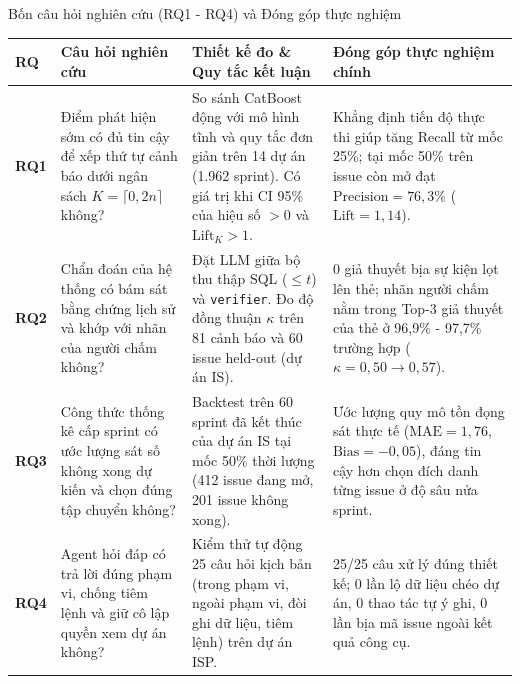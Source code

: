\begin{frame}{Bốn câu hỏi nghiên cứu (RQ1 - RQ4) và Đóng góp thực nghiệm}
  \scriptsize
  \setlength{\tabcolsep}{4pt}
  \renewcommand{\arraystretch}{1.28}
  \begin{tabular}{L{0.07\textwidth}|L{0.28\textwidth}|L{0.31\textwidth}|L{0.28\textwidth}}
    \textbf{RQ} & \textbf{Câu hỏi nghiên cứu} & \textbf{Thiết kế đo \& Quy tắc kết luận} & \textbf{Đóng góp thực nghiệm chính} \\
    \hline
    \textbf{RQ1} & Điểm phát hiện sớm có đủ tin cậy để xếp thứ tự cảnh báo dưới ngân sách $K = \lceil 0{,}2n \rceil$ không? & So sánh CatBoost động với mô hình tĩnh và quy tắc đơn giản trên 14 dự án (1.962 sprint). Có giá trị khi CI 95\% của hiệu số $>0$ và $\text{Lift}_K > 1$. & Khẳng định tiến độ thực thi giúp tăng Recall từ mốc 25\%; tại mốc 50\% trên issue còn mở đạt $\text{Precision} = 76{,}3\%$ ($\text{Lift} = 1{,}14$). \\
    \hline
    \textbf{RQ2} & Chẩn đoán của hệ thống có bám sát bằng chứng lịch sử và khớp với nhãn của người chấm không? & Đặt LLM giữa bộ thu thập SQL ($\le t$) và \texttt{verifier}. Đo độ đồng thuận $\kappa$ trên 81 cảnh báo và 60 issue held-out (dự án IS). & 0 giả thuyết bịa sự kiện lọt lên thẻ; nhãn người chấm nằm trong Top-3 giả thuyết của thẻ ở 96,9\% - 97,7\% trường hợp ($\kappa = 0{,}50 \to 0{,}57$). \\
    \hline
    \textbf{RQ3} & Công thức thống kê cấp sprint có ước lượng sát số không xong dự kiến và chọn đúng tập chuyển không? & Backtest trên 60 sprint đã kết thúc của dự án IS tại mốc 50\% thời lượng (412 issue đang mở, 201 issue không xong). & Ước lượng quy mô tồn đọng sát thực tế ($\text{MAE} = 1{,}76$, $\text{Bias} = -0{,}05$), đáng tin cậy hơn chọn đích danh từng issue ở độ sâu nửa sprint. \\
    \hline
    \textbf{RQ4} & Agent hỏi đáp có trả lời đúng phạm vi, chống tiêm lệnh và giữ cô lập quyền xem dự án không? & Kiểm thử tự động 25 câu hỏi kịch bản (trong phạm vi, ngoài phạm vi, đòi ghi dữ liệu, tiêm lệnh) trên dự án ISP. & 25/25 câu xử lý đúng thiết kế; 0 lần lộ dữ liệu chéo dự án, 0 thao tác tự ý ghi, 0 lần bịa mã issue ngoài kết quả công cụ. \\
  \end{tabular}
\end{frame}

